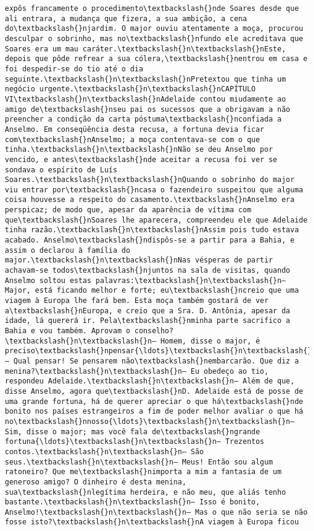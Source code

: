 \begin{Verbatim}[commandchars=\\\{\}]
expôs francamente o procedimento\textbackslash{}nde Soares desde que ali entrara, a mudança que fizera, a sua ambição, a cena do\textbackslash{}njardim. O major ouviu atentamente a moça, procurou desculpar o sobrinho, mas no\textbackslash{}nfundo ele acreditava que Soares era um mau caráter.\textbackslash{}n\textbackslash{}nEste, depois que pôde refrear a sua cólera,\textbackslash{}nentrou em casa e foi despedir-se do tio até o dia seguinte.\textbackslash{}n\textbackslash{}nPretextou que tinha um negócio urgente.\textbackslash{}n\textbackslash{}nCAPÍTULO VI\textbackslash{}n\textbackslash{}nAdelaide contou miudamente ao amigo de\textbackslash{}nseu pai os sucessos que a obrigavam a não preencher a condição da carta póstuma\textbackslash{}nconfiada a Anselmo. Em conseqüência desta recusa, a fortuna devia ficar com\textbackslash{}nAnselmo; a moça contentava-se com o que tinha.\textbackslash{}n\textbackslash{}nNão se deu Anselmo por vencido, e antes\textbackslash{}nde aceitar a recusa foi ver se sondava o espírito de Luís Soares.\textbackslash{}n\textbackslash{}nQuando o sobrinho do major viu entrar por\textbackslash{}ncasa o fazendeiro suspeitou que alguma coisa houvesse a respeito do casamento.\textbackslash{}nAnselmo era perspicaz; de modo que, apesar da aparência de vítima com que\textbackslash{}nSoares lhe aparecera, compreendeu ele que Adelaide tinha razão.\textbackslash{}n\textbackslash{}nAssim pois tudo estava acabado. Anselmo\textbackslash{}ndispôs-se a partir para a Bahia, e assim o declarou à família do major.\textbackslash{}n\textbackslash{}nNas vésperas de partir achavam-se todos\textbackslash{}njuntos na sala de visitas, quando Anselmo soltou estas palavras:\textbackslash{}n\textbackslash{}n— Major, está ficando melhor e forte; eu\textbackslash{}ncreio que uma viagem à Europa lhe fará bem. Esta moça também gostará de ver a\textbackslash{}nEuropa, e creio que a Sra. D. Antônia, apesar da idade, lá quererá ir. Pela\textbackslash{}nminha parte sacrifico a Bahia e vou também. Aprovam o conselho?\textbackslash{}n\textbackslash{}n— Homem, disse o major, é preciso\textbackslash{}npensar{\ldots}\textbackslash{}n\textbackslash{}n— Qual pensar! Se pensarem não\textbackslash{}nembarcarão. Que diz a menina?\textbackslash{}n\textbackslash{}n— Eu obedeço ao tio, respondeu Adelaide.\textbackslash{}n\textbackslash{}n— Além de que, disse Anselmo, agora que\textbackslash{}nD. Adelaide está de posse de uma grande fortuna, há de querer apreciar o que há\textbackslash{}nde bonito nos países estrangeiros a fim de poder melhor avaliar o que há no\textbackslash{}nnosso{\ldots}\textbackslash{}n\textbackslash{}n— Sim, disse o major; mas você fala de\textbackslash{}ngrande fortuna{\ldots}\textbackslash{}n\textbackslash{}n— Trezentos contos.\textbackslash{}n\textbackslash{}n— São seus.\textbackslash{}n\textbackslash{}n— Meus! Então sou algum ratoneiro? Que me\textbackslash{}nimporta a mim a fantasia de um generoso amigo? O dinheiro é desta menina, sua\textbackslash{}nlegítima herdeira, e não meu, que aliás tenho bastante.\textbackslash{}n\textbackslash{}n— Isso é bonito, Anselmo!\textbackslash{}n\textbackslash{}n— Mas o que não seria se não fosse isto?\textbackslash{}n\textbackslash{}nA viagem à Europa ficou 
\end{Verbatim}
